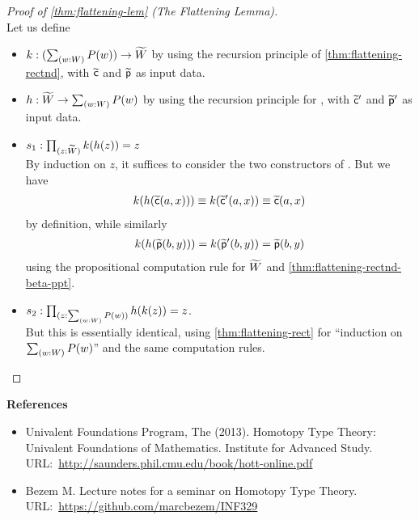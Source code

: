 \documentclass[centering]{report}
\newenvironment{slide}
    {\newpage
    \vspace*{\fill}
    }
    {
     \vspace*{\fill}
    }
\begin{document}
\begin{slide}
\begin{proof}[Proof of \cref{thm:flattening-lem} (The Flattening Lemma)]
\hspace*{5cm}\\
Let us define
\begin{itemize}
    \item $k:(\sm{w:W}P(w)) \to \Wtil$ by using the recursion
    principle of \cref{thm:flattening-rectnd}, with $\widetilde{\mathsf{c}}$ and
    $\widetilde{\mathsf{p}}$ as input data.

    \item $h:\Wtil \to \sm{w:W}P(w)$ by using the recursion principle
    for \Wtil, with $\widetilde{\mathsf{c}}'$ and $\widetilde{\mathsf{p}}'$ as input data.
\vspace*{\fill}
\newpage
\vspace*{\fill}
    \item $s_1 : \prd{z : \Wtil} k(h(z)) = z$\\
    By induction on $z$, it suffices to consider the two constructors of \Wtil.
  But we have
  \begin{align*}
    k(h(\widetilde{\mathsf{c}}(a,x))) \equiv k(\widetilde{\mathsf{c}}'(a,x)) \equiv \widetilde{\mathsf{c}}(a,x)
  \end{align*}
  by definition, while similarly
  \begin{align*}
  {k}\mathopen{}\left({{h}\mathopen{}\left({\widetilde{\mathsf{p}}(b,y)}\right)\mathclose{}}\right)\mathclose{} = {k}\mathopen{}\left({\widetilde{\mathsf{p}}'(b,y)}\right)\mathclose{} = \widetilde{\mathsf{p}}(b,y)
  \end{align*}
  using the propositional computation rule for $\widetilde{W}$ and \cref{thm:flattening-rectnd-beta-ppt}.

  \item  $s_2 : \prd{z : \sm{w:W}P(w)} h(k(z)) = z$.\\
  But this is essentially identical, using \cref{thm:flattening-rect}
  for ``induction on $\sm{w:W}P(w)$'' and the same computation rules.
  \end{itemize}
\end{proof}
\end{slide}

\begin{slide}
\textbf{\color{darkred} References}
\begin{itemize}
\item Univalent Foundations Program, The (2013). Homotopy Type Theory:
Univalent Foundations of Mathematics. Institute for Advanced Study.\\ URL:~\url{http://saunders.phil.cmu.edu/book/hott-online.pdf}
\item Bezem M. Lecture notes for a seminar on Homotopy Type Theory.
URL:~\url{https://github.com/marcbezem/INF329}
\end{itemize}
\end{slide}
\end{document}
